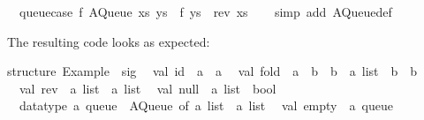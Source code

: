 \begin{isabellebody}
\ \ {}queue{}case\ f\ {}AQueue\ xs\ ys{}\ {}\ f\ {}ys\ {}\ rev\ xs{}{}\isanewline
\ \ \isamarkupfalse%
\ {}simp\ add{}\ AQueue{}def{}%
\endisatagquote
{\isafoldquote}%
%
\isadelimquote
%
\endisadelimquote
%
\begin{isamarkuptext}%
\noindent The resulting code looks as expected:%
\end{isamarkuptext}%
\isamarkuptrue%
%
\isadelimquotetypewriter
%
\endisadelimquotetypewriter
%
\isatagquotetypewriter
%
\begin{isamarkuptext}%
structure\ Example\ {}\ sig\isanewline
\ \ val\ id\ {}\ {}a\ {}{}\ {}a\isanewline
\ \ val\ fold\ {}\ {}{}a\ {}{}\ {}b\ {}{}\ {}b{}\ {}{}\ {}a\ list\ {}{}\ {}b\ {}{}\ {}b\isanewline
\ \ val\ rev\ {}\ {}a\ list\ {}{}\ {}a\ list\isanewline
\ \ val\ null\ {}\ {}a\ list\ {}{}\ bool\isanewline
\ \ datatype\ {}a\ queue\ {}\ AQueue\ of\ {}a\ list\ {}\ {}a\ list\isanewline
\ \ val\ empty\ {}\ {}a\ queue\isanewline

\end{isamarkuptext}
\end{isabellebody}
